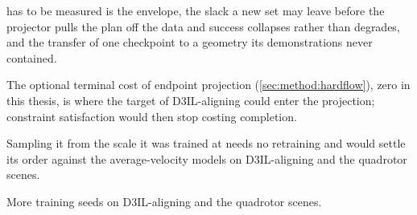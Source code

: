 \begin{description}
    has to be measured is the envelope, the slack a new set may leave before the projector pulls the
    plan off the data and success collapses rather than degrades, and the transfer of one checkpoint to
    a geometry its demonstrations never contained.
  \item[The alignment target.] The optional terminal cost of endpoint projection
    (\autoref{sec:method:hardflow}), zero in this thesis, is where the target of D3IL-aligning could
    enter the projection; constraint satisfaction would then stop costing completion.
  \item[The sampler of instantaneous-velocity matching.] Sampling it from the scale it was trained at
    needs no retraining and would settle its order against the average-velocity models on
    D3IL-aligning and the quadrotor scenes.
  \item[Seeds.] More training seeds on D3IL-aligning and the quadrotor scenes.
\end{description}
